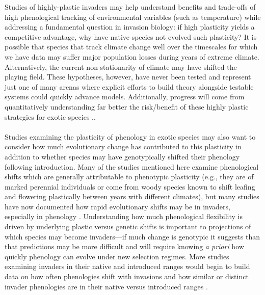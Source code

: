 \documentclass[11pt,a4paper,oneside]{article}
\begin{document}
Studies of highly-plastic invaders may help understand benefits and trade-offs of high phenological tracking of environmental variables (such as temperature) while addressing a fundamental question in invasion biology: if high plasticity yields a competitive advantage, why have native species not evolved such plasticity? It is possible that species that track climate change well over the timescales for which we have data may suffer major population losses during years of extreme climate. Alternatively, the current non-stationarity of climate may have shifted the playing field. These hypotheses, however, have never been tested and represent just one of many arenas where explicit efforts to build theory alongside testable systems could quickly advance models. Additionally, progress will come from quantitatively understanding far better the risk/benefit of these highly plastic strategies for exotic species \citep[e.g., exotic species that senesce later in the fall often lose green leaves to the first frost, which should be a major carbon and nutrient loss, see][]{Fridley:2012fj}..\\
\\
Studies examining the plasticity of phenology in exotic species may also want to consider how much evolutionary change has contributed to this plasticity \citep{sultan2013} in addition to whether species may have genotypically shifted their phenology following introduction. Many of the studies mentioned here examine phenological shifts which are generally attributable to phenotypic plasticity (e.g., they are of marked perennial individuals or come from woody species known to shift leafing and flowering plastically between years with different climates), but many studies have now documented how rapid evolutionary shifts may be in invaders, especially in phenology \citep[e.g.,][]{Colautti:2011,konarz2012,novy2012}. Understanding how much phenological flexibility is driven by underlying plastic versus genetic shifts is important to projections of which species may become invaders---if much change is genotypic it suggests than that predictions may be more difficult and will require knowing \emph{a priori} how quickly phenology can evolve under new selection regimes. More studies examining invaders in their native and introduced ranges \citep[e.g.,][]{Godoy:2009dz,matesanz2012} would begin to build data on how often phenologies shift with invasions and how similar or distinct invader phenologies are in their native versus introduced ranges \citep[e.g.,][]{wolkovichAmBot2013}.\\
\end{document}
